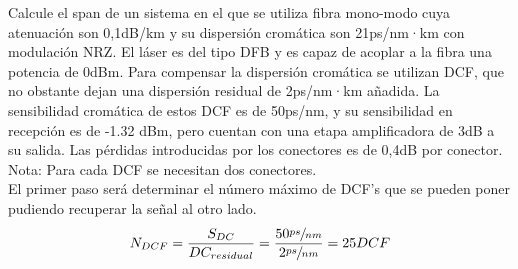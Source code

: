 \begin{exercise}[10]
	Calcule el span de un sistema en el que se utiliza fibra mono-modo cuya atenuación son 0,1dB/km y su dispersión cromática son 21ps/nm·km con modulación NRZ. El láser es del tipo DFB y es capaz de acoplar a la fibra una potencia de 0dBm. Para compensar la dispersión cromática se utilizan DCF, que no obstante dejan una dispersión residual de 2ps/nm·km añadida. La sensibilidad cromática de estos DCF es de 50ps/nm, y su sensibilidad en recepción es de -1.32 dBm, pero cuentan con una etapa amplificadora de 3dB a su salida. Las pérdidas introducidas por los conectores es de 0,4dB por conector.\\
Nota: Para cada DCF se necesitan dos conectores.\\
El primer paso será determinar el número máximo de DCF's que se pueden poner pudiendo recuperar la señal al otro lado.
\[N_{DCF}=\frac{S_{DC}}{DC_{residual}}=\frac{50\sfrac{ps}{nm}}{2\sfrac{ps}{nm}}=25DCF\]
\end{exercise}